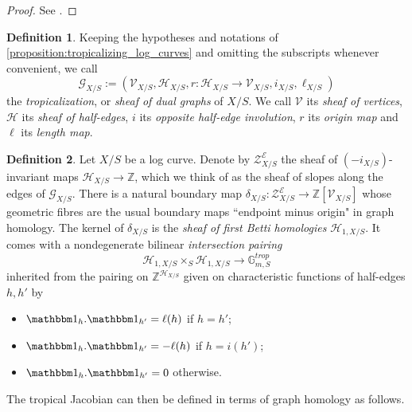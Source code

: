 \documentclass[a4paper,11pt]{amsart} %
\numberwithin{equation}{subsection}
\newcommand{\bb}[1]{{\mathbb{#1}}}
\newcommand{\ca}[1]{{\mathcal{#1}}}
\theoremstyle{definition}
\newtheorem{definition}{Definition}[section]
\theoremstyle{plain}%
\theoremstyle{remark}
\begin{document}
\begin{proof}
    See \cite[Section 3]{HMOP}.
\end{proof}

\begin{definition}\label{definition:tropicalization_log_curve}
    Keeping the hypotheses and notations of \ref{proposition:tropicalizing_log_curves} and omitting the subscripts whenever convenient, we call
    \[
    \ca G_{X/S}:=(\ca V_{X/S},\ca H_{X/S},r \colon \ca H_{X/S} \to \ca V_{X/S},i_{X/S},\ell_{X/S})
    \]
    the \emph{tropicalization}, or \emph{sheaf of dual graphs} of $X/S$. We call $\ca V$ its \emph{sheaf of vertices}, $\ca H$ its \emph{sheaf of half-edges}, $i$ its \emph{opposite half-edge involution}, $r$ its \emph{origin map} and $\ell$ its \emph{length map}.
\end{definition}

\begin{definition}\label{definition:sheaf_of_homologies_and_intersection_pairing}
    Let $X/S$ be a log curve. Denote by $\ca Z^{\ca E}_{X/S}$ the sheaf of $(-i_{X/S})$-invariant maps $\ca H_{X/S} \to \bb Z$, which we think of as the sheaf of slopes along the edges of $\ca G_{X/S}$. There is a natural boundary map $\delta_{X/S} \colon \ca Z^{\ca E}_{X/S} \to \bb Z[{\ca V}_{X/S}]$ whose geometric fibres are the usual boundary maps ``endpoint minus origin" in graph homology. The kernel of $\delta_{X/S}$ is the \emph{sheaf of first Betti homologies} $\ca H_{1,X/S}$. It comes with a nondegenerate bilinear \emph{intersection pairing}
    \[
    \ca H_{1,X/S} \times_S \ca H_{1,X/S} \to \bb G_{m,S}^{trop}
    \]
    inherited from the pairing on $\bb Z^{\mathcal H_{X/S}}$ given on characteristic functions of half-edges $h,h'$ by
    \begin{itemize}
        \item $\mathbbm 1_h.\mathbbm 1_{h'}=\ell(h)$ if $h=h'$;
        \item $\mathbbm 1_h.\mathbbm 1_{h'}=-\ell(h)$ if $h=i(h')$;
        \item $\mathbbm 1_h.\mathbbm 1_{h'}=0$ otherwise.
    \end{itemize}
\end{definition}


The tropical Jacobian can then be defined in terms of graph homology as follows.
\end{document}
